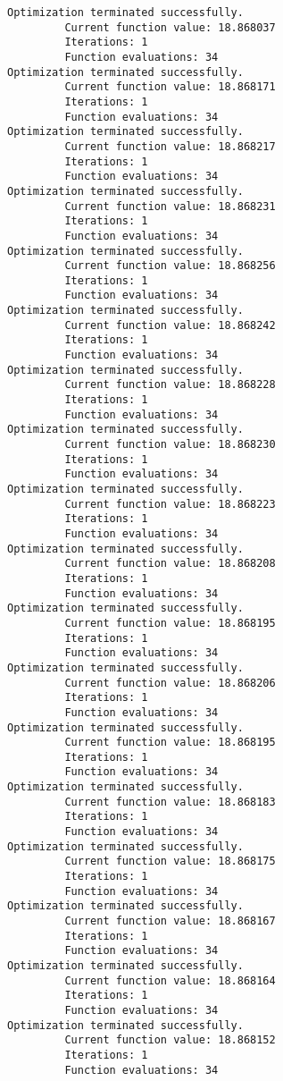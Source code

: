\documentclass[11pt]{article}
\begin{document}
    \begin{Verbatim}[commandchars=\\\{\}]
Optimization terminated successfully.
         Current function value: 18.868037
         Iterations: 1
         Function evaluations: 34
Optimization terminated successfully.
         Current function value: 18.868171
         Iterations: 1
         Function evaluations: 34
Optimization terminated successfully.
         Current function value: 18.868217
         Iterations: 1
         Function evaluations: 34
Optimization terminated successfully.
         Current function value: 18.868231
         Iterations: 1
         Function evaluations: 34
Optimization terminated successfully.
         Current function value: 18.868256
         Iterations: 1
         Function evaluations: 34
Optimization terminated successfully.
         Current function value: 18.868242
         Iterations: 1
         Function evaluations: 34
Optimization terminated successfully.
         Current function value: 18.868228
         Iterations: 1
         Function evaluations: 34
Optimization terminated successfully.
         Current function value: 18.868230
         Iterations: 1
         Function evaluations: 34
Optimization terminated successfully.
         Current function value: 18.868223
         Iterations: 1
         Function evaluations: 34
Optimization terminated successfully.
         Current function value: 18.868208
         Iterations: 1
         Function evaluations: 34
Optimization terminated successfully.
         Current function value: 18.868195
         Iterations: 1
         Function evaluations: 34
Optimization terminated successfully.
         Current function value: 18.868206
         Iterations: 1
         Function evaluations: 34
Optimization terminated successfully.
         Current function value: 18.868195
         Iterations: 1
         Function evaluations: 34
Optimization terminated successfully.
         Current function value: 18.868183
         Iterations: 1
         Function evaluations: 34
Optimization terminated successfully.
         Current function value: 18.868175
         Iterations: 1
         Function evaluations: 34
Optimization terminated successfully.
         Current function value: 18.868167
         Iterations: 1
         Function evaluations: 34
Optimization terminated successfully.
         Current function value: 18.868164
         Iterations: 1
         Function evaluations: 34
Optimization terminated successfully.
         Current function value: 18.868152
         Iterations: 1
         Function evaluations: 34

\end{Verbatim}
\end{document}
